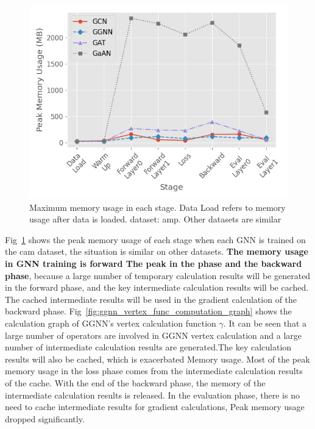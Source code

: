 \begin{figure}
    \centering
    \includegraphics[width=0.7\columnwidth]{figs/experiments/exp_memory_usage_stage_amp.png}
    \caption{Maximum memory usage in each stage. Data Load refers to memory usage after data is loaded. dataset: amp. Other datasets are similar}
    \label{fig:exp_memory_usage_stage_amp}
\end{figure}

Fig~\ref{fig:exp_memory_usage_stage_amp} shows the peak memory usage of each stage when each GNN is trained on the cam dataset, the situation is similar on other datasets.
\textbf{The memory usage in GNN training is forward The peak in the phase and the backward phase}, 
because a large number of temporary calculation results will be generated in the forward phase,
and the key intermediate calculation results will be cached.
The cached intermediate results will be used in the gradient calculation of the backward phase.
Fig~\ref{fig:ggnn_vertex_func_computation_graph} shows the calculation graph of GGNN's vertex calculation function $\gamma$.
It can be seen that a large number of operators are involved in GGNN vertex calculation and a large number of intermediate calculation results are generated.The key calculation results will also be cached,
which is exacerbated Memory usage. Most of the peak memory usage in the loss phase comes from the intermediate calculation results of the cache.
With the end of the backward phase, the memory of the intermediate calculation results is released.
In the evaluation phase, there is no need to cache intermediate results for gradient calculations, Peak memory usage dropped significantly.

